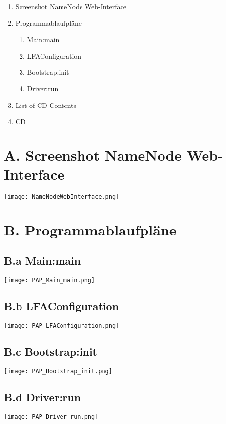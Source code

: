 
\addchap{\langanhang}

{\Large
\begin{enumerate}[label=\Alph*.]
	\item Screenshot NameNode Web-Interface
	\item Programmablaufpläne
	\begin{enumerate}
		\item Main:main
		\item LFAConfiguration
		\item Bootstrap:init
		\item Driver:run
	\end{enumerate}
	\item List of CD Contents
	\item CD 
\end{enumerate}
}
\pagebreak

\section*{A. Screenshot NameNode Web-Interface}\label{sec:ScreenNameNodeWeb}
\texttt{[image: NameNodeWebInterface.png]}
\pagebreak

\section*{B. Programmablaufpläne}

\subsection*{B.a Main:main}\label{subsec:PAPMainMain}
\centering
\texttt{[image: PAP\_Main\_main.png]}
\pagebreak

\subsection*{B.b LFAConfiguration}\label{subsec:PAPLFAConfiguration}
\centering
\texttt{[image: PAP\_LFAConfiguration.png]}
\pagebreak

\subsection*{B.c Bootstrap:init}\label{subsec:PAPBootstrapInit}
\centering
\texttt{[image: PAP\_Bootstrap\_init.png]}
\pagebreak

\subsection*{B.d Driver:run}\label{subsec:PAPDriverRun}
\centering
\texttt{[image: PAP\_Driver\_run.png]}
\pagebreak

